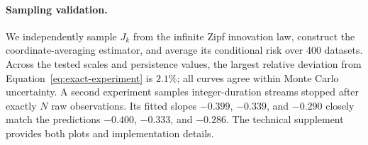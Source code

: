 \paragraph{Sampling validation.}
We independently sample $J_k$ from the infinite Zipf innovation law, construct
the coordinate-averaging estimator, and average its conditional risk over
400 datasets. Across the tested scales and persistence values, the largest
relative deviation from Equation~\eqref{eq:exact-experiment} is $2.1\%$; all
curves agree within Monte Carlo uncertainty. A second experiment samples
integer-duration streams stopped after exactly $N$ raw observations. Its fitted
slopes $-0.399$, $-0.339$, and $-0.290$ closely match the predictions
$-0.400$, $-0.333$, and $-0.286$. The technical supplement provides both plots
and implementation details.

